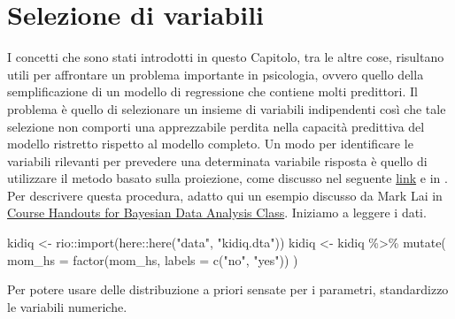 \documentclass[
  10pt,
  italian,
  a4paper,
  extrafontsizes,onecolumn,openright
  ]{memoir}
\newenvironment{Shaded}{\begin{snugshade}}{\end{snugshade}}
\newcommand{\AttributeTok}[1]{\textcolor[rgb]{0.77,0.63,0.00}{#1}}
\newcommand{\FunctionTok}[1]{\textcolor[rgb]{0.00,0.00,0.00}{#1}}
\newcommand{\NormalTok}[1]{#1}
\newcommand{\OtherTok}[1]{\textcolor[rgb]{0.56,0.35,0.01}{#1}}
\newcommand{\SpecialCharTok}[1]{\textcolor[rgb]{0.00,0.00,0.00}{#1}}
\newcommand{\StringTok}[1]{\textcolor[rgb]{0.31,0.60,0.02}{#1}}
\theoremstyle{definition}
\theoremstyle{definition}
\theoremstyle{definition}
\theoremstyle{definition}
\theoremstyle{remark}
\begin{document}
\hypertarget{selezione-di-variabili}{%
\section{Selezione di variabili}\label{selezione-di-variabili}}

I concetti che sono stati introdotti in questo Capitolo, tra le altre cose, risultano utili per affrontare un problema importante in psicologia, ovvero quello della semplificazione di un modello di regressione che contiene molti predittori. Il problema è quello di selezionare un insieme di variabili indipendenti così che tale selezione non comporti una apprezzabile perdita nella capacità predittiva del modello ristretto rispetto al modello completo. Un modo per identificare le variabili rilevanti per prevedere una determinata variabile risposta è quello di utilizzare il metodo basato sulla proiezione, come discusso nel seguente \href{https://cran.r-project.org/web/packages/projpred/vignettes/quickstart.html}{link} e in \textcite{piironen2017comparison}. Per descrivere questa procedura, adatto qui un esempio discusso da Mark Lai in \href{https://bookdown.org/marklhc/notes_bookdown/model-comparison-and-regularization.html}{Course Handouts for Bayesian Data Analysis Class}. Iniziamo a leggere i dati.

\begin{Shaded}
\begin{Highlighting}[]
\NormalTok{kidiq }\OtherTok{\textless{}{-}}\NormalTok{ rio}\SpecialCharTok{::}\FunctionTok{import}\NormalTok{(here}\SpecialCharTok{::}\FunctionTok{here}\NormalTok{(}\StringTok{"data"}\NormalTok{, }\StringTok{"kidiq.dta"}\NormalTok{))}
\NormalTok{kidiq }\OtherTok{\textless{}{-}}\NormalTok{ kidiq }\SpecialCharTok{\%\textgreater{}\%}
  \FunctionTok{mutate}\NormalTok{(}
    \AttributeTok{mom\_hs =} \FunctionTok{factor}\NormalTok{(mom\_hs, }\AttributeTok{labels =} \FunctionTok{c}\NormalTok{(}\StringTok{"no"}\NormalTok{, }\StringTok{"yes"}\NormalTok{))}
\NormalTok{  )}
\end{Highlighting}
\end{Shaded}

\noindent
Per potere usare delle distribuzione a priori sensate per i parametri, standardizzo le variabili numeriche.
\end{document}

